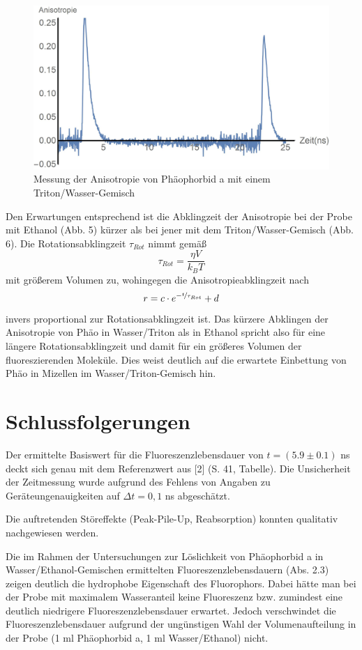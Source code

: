 \documentclass{article}
\begin{document}
\begin{figure}[H]
  \centering
  \includegraphics[width=\textwidth]{Bilder/anisotropie_triton.jpg}
  \caption{Messung der Anisotropie von Phäophorbid a mit einem Triton/Wasser-Gemisch}
\end{figure}


\newpage

Den Erwartungen entsprechend ist die Abklingzeit der Anisotropie bei der Probe mit Ethanol (Abb. 5) kürzer als bei jener mit dem Triton/Wasser-Gemisch (Abb. 6). Die Rotationsabklingzeit $\tau_{Rot}$ nimmt gemäß $$ \tau_{Rot}=\frac{\eta V}{k_B T} $$
mit größerem Volumen zu, wohingegen die Anisotropieabklingzeit nach $$ r= c \cdot e^{-\nicefrac{t}{\tau_{Rot}}}+d $$
invers proportional zur Rotationsabklingzeit ist. Das kürzere Abklingen der Anisotropie von Phäo in Wasser/Triton als in Ethanol spricht also für eine längere Rotationsabklingzeit und damit für ein größeres Volumen der fluoreszierenden Moleküle. Dies weist deutlich auf die erwartete Einbettung von Phäo in Mizellen im Wasser/Triton-Gemisch hin.



\section{Schlussfolgerungen}
Der ermittelte Basiswert für die Fluoreszenzlebensdauer von $t=(5.9 \pm 0.1)$ ns deckt sich genau mit dem Referenzwert aus [2] (S. 41, Tabelle). Die Unsicherheit der Zeitmessung wurde aufgrund des Fehlens von Angaben zu Geräteungenauigkeiten auf $\Delta t=0,1$ ns abgeschätzt. 

Die auftretenden Störeffekte (Peak-Pile-Up, Reabsorption) konnten qualitativ nachgewiesen werden.


Die im Rahmen der Untersuchungen zur Löslichkeit von Phäophorbid a in Wasser/Ethanol-Gemischen ermittelten Fluoreszenzlebensdauern (Abs. 2.3) zeigen deutlich die hydrophobe Eigenschaft des Fluorophors. Dabei hätte man bei der Probe mit maximalem Wasseranteil keine Fluoreszenz bzw. zumindest eine deutlich niedrigere Fluoreszenzlebensdauer erwartet. Jedoch verschwindet die Fluoreszenzlebensdauer aufgrund der ungünstigen Wahl der Volumenaufteilung in der Probe (1 ml Phäophorbid a, 1 ml Wasser/Ethanol) nicht.
\end{document}
